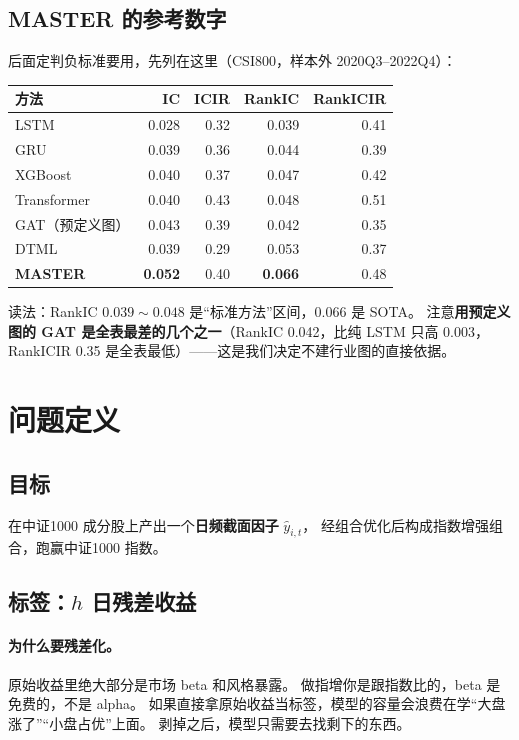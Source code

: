 \documentclass[11pt, a4paper]{ctexart}
\begin{document}
\subsection{MASTER 的参考数字}
后面定判负标准要用，先列在这里（CSI800，样本外 2020Q3--2022Q4）：

\begin{center}
\small
\begin{tabular}{lrrrr}
\toprule
方法 & IC & ICIR & RankIC & RankICIR \\
\midrule
LSTM & 0.028 & 0.32 & 0.039 & 0.41 \\
GRU & 0.039 & 0.36 & 0.044 & 0.39 \\
XGBoost & 0.040 & 0.37 & 0.047 & 0.42 \\
Transformer & 0.040 & 0.43 & 0.048 & 0.51 \\
GAT（预定义图） & 0.043 & 0.39 & 0.042 & 0.35 \\
DTML & 0.039 & 0.29 & 0.053 & 0.37 \\
\textbf{MASTER} & \textbf{0.052} & 0.40 & \textbf{0.066} & 0.48 \\
\bottomrule
\end{tabular}
\end{center}

读法：RankIC $0.039\sim0.048$ 是“标准方法”区间，$0.066$ 是 SOTA。
注意\textbf{用预定义图的 GAT 是全表最差的几个之一}（RankIC 0.042，比纯 LSTM 只高 0.003，
RankICIR 0.35 是全表最低）——这是我们决定不建行业图的直接依据。

\section{问题定义}

\subsection{目标}
在中证1000 成分股上产出一个\textbf{日频截面因子} $\hat{y}_{i,t}$，
经组合优化后构成指数增强组合，跑赢中证1000 指数。

\subsection{标签：$h$ 日残差收益}

\paragraph{为什么要残差化。}原始收益里绝大部分是市场 beta 和风格暴露。
做指增你是跟指数比的，beta 是免费的，不是 alpha。
如果直接拿原始收益当标签，模型的容量会浪费在学“大盘涨了”“小盘占优”上面。
剥掉之后，模型只需要去找剩下的东西。
\end{document}
